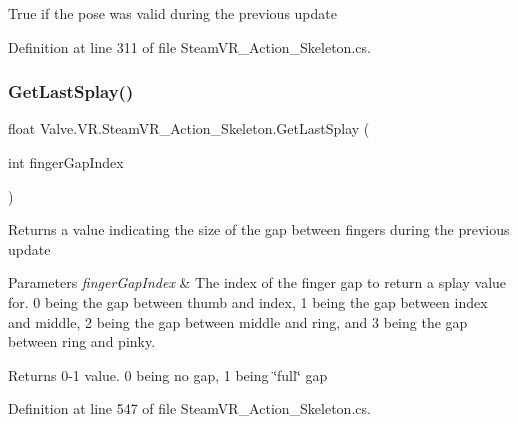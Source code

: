 True if the pose was valid during the previous update 



Definition at line 311 of file Steam\+V\+R\+\_\+\+Action\+\_\+\+Skeleton.\+cs.

\mbox{\label{class_valve_1_1_v_r_1_1_steam_v_r___action___skeleton_a9887af0901b58344a5188fea945ff082}} 
\subsubsection{\texorpdfstring{GetLastSplay()}{GetLastSplay()}\hspace{0.1cm}{\footnotesize\ttfamily [1/2]}}
{\footnotesize\ttfamily float Valve.\+V\+R.\+Steam\+V\+R\+\_\+\+Action\+\_\+\+Skeleton.\+Get\+Last\+Splay (\begin{DoxyParamCaption}\item[{int}]{finger\+Gap\+Index }\end{DoxyParamCaption})}



Returns a value indicating the size of the gap between fingers during the previous update 


\begin{DoxyParams}{Parameters}
{\em finger\+Gap\+Index} & The index of the finger gap to return a splay value for. 0 being the gap between thumb and index, 1 being the gap between index and middle, 2 being the gap between middle and ring, and 3 being the gap between ring and pinky.\\
\hline
\end{DoxyParams}
\begin{DoxyReturn}{Returns}
0-\/1 value. 0 being no gap, 1 being \char`\"{}full\char`\"{} gap
\end{DoxyReturn}


Definition at line 547 of file Steam\+V\+R\+\_\+\+Action\+\_\+\+Skeleton.\+cs.

\mbox{\label{class_valve_1_1_v_r_1_1_steam_v_r___action___skeleton_a1c0f4446ac1ae1fdaebc267dbe49bba9}} 
